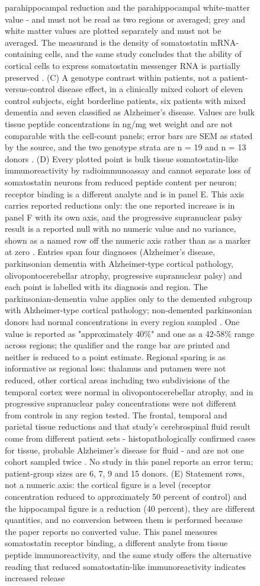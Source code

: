 \documentclass[11pt]{article}
\begin{document}
\begin{figure}[H]
parahippocampal reduction and the parahippocampal white-matter value - and must not be read as two regions or averaged; grey and white matter values are plotted separately and must not be averaged. The measurand is the density of somatostatin mRNA-containing cells, and the same study concludes that the ability of cortical cells to express somatostatin messenger RNA is partially preserved \citep{Dournaud1994}. (C) A genotype contrast within patients, not a patient-versus-control disease effect, in a clinically mixed cohort of eleven control subjects, eight borderline patients, six patients with mixed dementia and seven classified as Alzheimer's disease. Values are bulk tissue peptide concentrations in ng/mg wet weight and are not comparable with the cell-count panels; error bars are SEM as stated by the source, and the two genotype strata are n = 19 and n = 13 donors \citep{Grouselle1998}. (D) Every plotted point is bulk tissue somatostatin-like immunoreactivity by radioimmunoassay and cannot separate loss of somatostatin neurons from reduced peptide content per neuron; receptor binding is a different analyte and is in panel E. This axis carries reported reductions only: the one reported increase is in panel F with its own axis, and the progressive supranuclear palsy result is a reported null with no numeric value and no variance, shown as a named row off the numeric axis rather than as a marker at zero \citep{Epelbaum1987}. Entries span four diagnoses (Alzheimer's disease, parkinsonian dementia with Alzheimer-type cortical pathology, olivopontocerebellar atrophy, progressive supranuclear palsy) and each point is labelled with its diagnosis and region. The parkinsonian-dementia value applies only to the demented subgroup with Alzheimer-type cortical pathology; non-demented parkinsonian donors had normal concentrations in every region sampled \citep{Beal1986d}. One value is reported as "approximately 40\%" and one as a 42-58\% range across regions; the qualifier and the range bar are printed and neither is reduced to a point estimate. Regional sparing is as informative as regional loss: thalamus and putamen were not reduced, other cortical areas including two subdivisions of the temporal cortex were normal in olivopontocerebellar atrophy, and in progressive supranuclear palsy concentrations were not different from controls in any region tested. The frontal, temporal and parietal tissue reductions and that study's cerebrospinal fluid result come from different patient sets - histopathologically confirmed cases for tissue, probable Alzheimer's disease for fluid - and are not one cohort sampled twice \citep{Reinikainen1987}. No study in this panel reports an error term; patient-group sizes are 6, 7, 9 and 15 donors. (E) Statement rows, not a numeric axis: the cortical figure is a level (receptor concentration reduced to approximately 50 percent of control) and the hippocampal figure is a reduction (40 percent), they are different quantities, and no conversion between them is performed because the paper reports no converted value. This panel measures somatostatin receptor binding, a different analyte from tissue peptide immunoreactivity, and the same study offers the alternative reading that reduced somatostatin-like immunoreactivity indicates increased release 
\end{figure}
\end{document}
